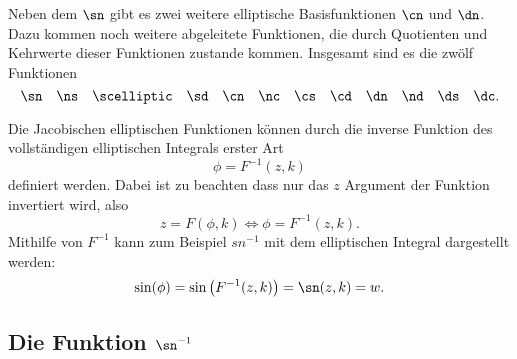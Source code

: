 Neben dem $\sn$ gibt es zwei weitere elliptische Basisfunktionen $\cn$ und $\dn$.
Dazu kommen noch weitere abgeleitete Funktionen, die durch Quotienten und Kehrwerte dieser Funktionen zustande kommen.
Insgesamt sind es die zwölf Funktionen
\begin{equation*}
    \sn \quad
    \ns \quad
    \scelliptic \quad
    \sd \quad
    \cn \quad
    \nc \quad
    \cs \quad
    \cd \quad
    \dn \quad
    \nd \quad
    \ds \quad
    \dc.
\end{equation*}

Die Jacobischen elliptischen Funktionen können durch die inverse Funktion des vollständigen elliptischen Integrals erster Art
\begin{equation}
    \phi = F^{-1}(z, k)
\end{equation}
definiert werden. Dabei ist zu beachten dass nur das $z$ Argument der Funktion invertiert wird, also
\begin{equation}
    z = F(\phi, k)
    \Leftrightarrow
    \phi = F^{-1}(z, k).
\end{equation}
Mithilfe von $F^{-1}$ kann zum Beispiel $sn^{-1}$ mit dem elliptischen Integral dargestellt werden:
\begin{equation}
    \sin(\phi)
    =
    \sin \left( F^{-1}(z, k) \right)
    =
    \sn(z, k)
    =
    w.
\end{equation}

\subsection{Die Funktion $\sn^{-1}$}


